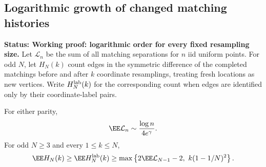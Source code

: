\documentclass[11pt,letterpaper]{article}
\newcommand{\status}[1]{\textbf{Status: #1.}}
\begin{document}
\subsection{Logarithmic growth of changed matching histories}
\label{sec:history-growth}

\status{Working proof: logarithmic order for every fixed resampling size}
Let $\mathcal L_n$ be the sum of all matching separations for $n$ iid
uniform points. For odd $N$, let $H_N(k)$ count edges in the symmetric
difference of the completed matchings before and after $k$ coordinate
resamplings, treating fresh locations as new vertices. Write
$H_N^{\rm lab}(k)$ for the corresponding count when edges are identified
only by their coordinate-label pairs.

\begin{lemma}
\label{lem:history-lower}
For either parity,
\begin{equation}\label{eq:total-matching-length}
 \EE\mathcal L_n\sim\frac{\log n}{4e^\gamma}.
\end{equation}
For odd $N\ge3$ and every $1\le k\le N$,
\begin{equation}\label{eq:history-lower}
 \EE H_N(k)\ge\EE H_N^{\rm lab}(k)
 \ge\max\left\{2\EE\mathcal L_{N-1}-2,\
                       k(1-1/N)^2\right\}.
\end{equation}
\end{lemma}
\end{document}
